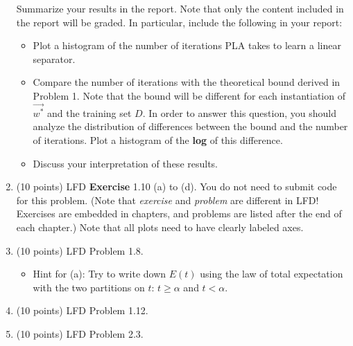 \documentclass[11pt]{article}
\begin{document}
\begin{enumerate}
  Summarize your results in the report. Note that only the content included in the report will be graded. In particular, include the following in your report:
  \begin{itemize}
    \item Plot a histogram of the number of iterations PLA takes to learn a linear separator.
    \item Compare the number of iterations with the theoretical bound derived in Problem 1. 
  Note that the bound will be different for each instantiation of $\vec{w^*}$ and the training set $D$. 
  In order to answer this question, you should analyze the
  distribution of differences between the bound and the number of
  iterations. Plot a histogram of the \textbf{log} of this difference.
  \item Discuss your interpretation of these results.
  \end{itemize}

\item (10 points) LFD \textbf{Exercise} 1.10 (a) to (d). You do not need to submit code for this problem. (Note that \emph{exercise} and \emph{problem} are different in LFD! Exercises are embedded in chapters, and problems are listed after the end of each chapter.) Note that all plots need to have clearly labeled axes.

\item (10 points) LFD Problem 1.8. 
\begin{itemize}
    \item Hint for (a): Try to write down $E(t)$ using the law of total expectation with the two partitions on $t$: $t\geq\alpha$ and $t<\alpha$.
\end{itemize}

\item (10 points) LFD Problem 1.12.

\item (10 points) LFD Problem 2.3.


\end{enumerate}
\end{document}
